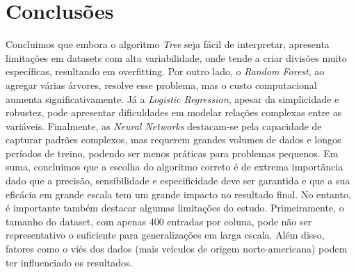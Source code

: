 \documentclass[conference]{IEEEtran}
\begin{document}
\section{Conclusões}
Concluimos que embora o algoritmo \textit{Tree} seja fácil de interpretar, apresenta limitações em datasets com alta variabilidade,
onde tende a criar divisões muito específicas, resultando em overfitting. Por outro lado, o \textit{Random Forest}, ao agregar várias
árvores, resolve esse problema, mas o custo computacional aumenta significativamente. Já a \textit{Logistic Regression}, apesar da
simplicidade e robustez, pode apresentar dificuldades em modelar relações complexas entre as variáveis. Finalmente, as \textit{Neural Networks}
destacam-se pela capacidade de capturar padrões complexos, mas requerem grandes volumes de dados e longos períodos de treino, podendo
ser menos práticas para problemas pequenos. Em suma, concluimos que a escolha do algoritmo correto é de extrema importância dado que
a precisão, sensibilidade e especificidade deve ser garantida e que a sua eficácia em grande escala tem um grande impacto no resultado final.
No entanto, é importante também destacar algumas limitações do estudo. Primeiramente, o tamanho do dataset, com apenas 400 entradas por coluna,
pode não ser representativo o suficiente para generalizações em larga escala. Além disso, fatores como o viés dos dados
(mais veículos de origem norte-americana) podem ter influenciado os resultados.

\printbibliography
\end{document}
